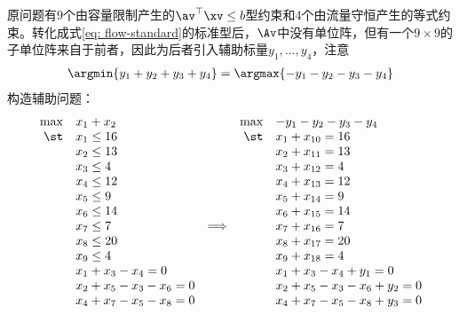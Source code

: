 \documentclass{ctexart}
\begin{document}
\begin{example} 
    原问题有$9$个由容量限制产生的$\av^\top \xv \le b$型约束和$4$个由流量守恒产生的等式约束。转化成式\eqref{eq: flow-standard}的标准型后，$\Av$中没有单位阵，但有一个$9 \times 9$的子单位阵来自于前者，因此为后者引入辅助标量$y_1, \ldots, y_4$，注意
    \begin{align*}
        \argmin \{ y_1 + y_2 + y_3 + y_4 \} = \argmax \{ -y_1 - y_2 - y_3 - y_4 \}
    \end{align*}
    构造辅助问题：
    \begin{align*}
        \begin{array}{rlcrl}
            \max & x_1 + x_2                 &                 & \max & -y_1 - y_2 - y_3 - y_4          \\
            \st  & x_1 \le 16                &                 & \st  & x_1 + x_{10} = 16               \\
                 & x_2 \le 13                &                 &      & x_2 + x_{11} = 13               \\
                 & x_3 \le 4                 &                 &      & x_3 + x_{12} = 4                \\
                 & x_4 \le 12                &                 &      & x_4 + x_{13} = 12               \\
                 & x_5 \le 9                 &                 &      & x_5 + x_{14} = 9                \\
                 & x_6 \le 14                &                 &      & x_6 + x_{15} = 14               \\
                 & x_7 \le 7                 & \Longrightarrow &      & x_7 + x_{16} = 7                \\
                 & x_8 \le 20                &                 &      & x_8 + x_{17} = 20               \\
                 & x_9 \le 4                 &                 &      & x_9 + x_{18} = 4                \\
                 & x_1 + x_3 - x_4 = 0       &                 &      & x_1 + x_3 - x_4 + y_1 = 0       \\
                 & x_2 + x_5 - x_3 - x_6 = 0 &                 &      & x_2 + x_5 - x_3 - x_6 + y_2 = 0 \\
                 & x_4 + x_7 - x_5 - x_8 = 0 &                 &      & x_4 + x_7 - x_5 - x_8 + y_3 = 0 \\

\end{array}
\end{align*}
\end{example}
\end{document}
